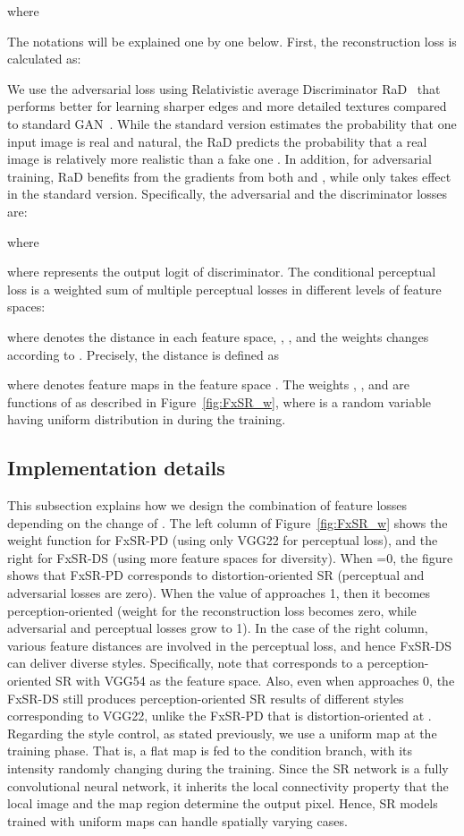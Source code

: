 \documentclass{article}
\begin{document}
where


The notations will be explained one by one below.
First, the reconstruction loss is calculated as:

We use the adversarial loss using Relativistic average Discriminator RaD~\cite{Jolicoeur-Martineau19} that performs better for learning sharper edges and more detailed textures compared to standard GAN~\cite{goodfellow2014generative}. While the standard version estimates the probability that one input image  is real and natural, the RaD predicts the probability that a real image  is relatively more realistic than a fake one . In addition, for adversarial training, RaD benefits from the gradients from both  and , while only  takes effect in the standard version.
Specifically, the adversarial and the discriminator losses are:


where 


where  represents the output logit of discriminator.
The conditional perceptual loss is a weighted sum of multiple perceptual losses in different levels of feature spaces:

where  denotes the distance in each feature space, , , and the weights  changes according to .
Precisely, the distance  is defined as

where  denotes feature maps in the feature space .
The weights , , and  are functions of  as described in Figure~\ref{fig:FxSR_w}, where  is a random variable having uniform distribution in  during the training.
\subsection{Implementation details}
This subsection explains how we design the combination of feature losses depending on the change of .
The left column of Figure~\ref{fig:FxSR_w} shows the weight function for FxSR-PD (using only VGG22 for perceptual loss), and the right for FxSR-DS (using more feature spaces for diversity).
When =0, the figure shows that FxSR-PD corresponds to distortion-oriented SR (perceptual and adversarial losses are zero). When the value of  approaches 1, then it becomes perception-oriented (weight for the reconstruction loss becomes zero, while adversarial and perceptual losses grow to 1). In the case of the right column, various feature distances are involved in the perceptual loss, and hence FxSR-DS can deliver diverse styles. Specifically, note that  corresponds to a perception-oriented SR with VGG54 as the feature space. Also, even when  approaches 0, the FxSR-DS still produces perception-oriented SR results of different styles corresponding to VGG22, unlike the FxSR-PD that is distortion-oriented at .
Regarding the style control, as stated previously, we use a uniform map  at the training phase. That is, a flat map is fed to the condition branch, with its intensity  randomly changing during the training. Since the SR network is a fully convolutional neural network, it inherits the local connectivity property that the local image and the map region determine the output pixel. Hence, SR models trained with uniform maps can handle spatially varying cases. 
\end{document}
